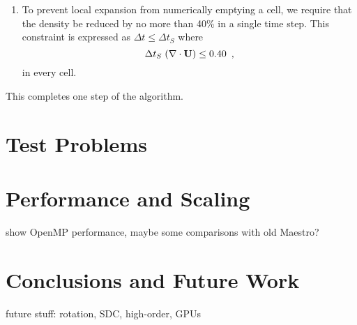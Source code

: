 \documentclass{aastex62}
\newcommand{\Ub}{{\bf{U}}}
\newcommand{\dt}{\Delta t}
\begin{document}
\begin{description}
\begin{enumerate}
\item To prevent local expansion from numerically emptying a cell,
  we require that the density be reduced by no more than 40\% in a single time step.
  This constraint is expressed as $\dt \leq \dt_S$ where
\begin{equation}
 \Delta t_S \; (\nabla \cdot \Ub)  \leq 0.40 \enskip ,
\end{equation}
  in every cell.

\end{enumerate}

\end{description}

\noindent This completes one step of the algorithm.


\section{Test Problems}


\section{Performance and Scaling}

show OpenMP performance, maybe some comparisons with old Maestro?

\section{Conclusions and Future Work}

future stuff: rotation, SDC, high-order, GPUs

\acknowledgements




\end{document}
